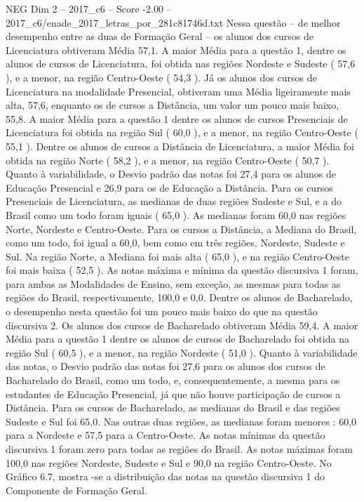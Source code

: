 \begin{textsample}{NEG Dim 2 – 2017\_c6 – Score -2.00 – 2017\_c6/enade\_2017\_letras\_por\_281c81746d.txt}
Nessa questão – de melhor desempenho entre as duas de Formação Geral – os alunos dos cursos de Licenciatura obtiveram Média 57,1.
A maior Média para a questão 1, dentre os alunos de cursos de Licenciatura, foi obtida nas regiões Nordeste e Sudeste ( 57,6 ), e a menor, na região Centro-Oeste ( 54,3 ).
Já os alunos dos cursos de Licenciatura na modalidade Presencial, obtiveram uma Média ligeiramente mais alta, 57,6, enquanto os de cursos a Distância, um valor um pouco mais baixo, 55,8.
A maior Média para a questão 1 dentre os alunos de cursos Presenciais de Licenciatura foi obtida na região Sul ( 60,0 ), e a menor, na região Centro-Oeste ( 55,1 ).
Dentre os alunos de cursos a Distância de Licenciatura, a maior Média foi obtida na região Norte ( 58,2 ), e a menor, na região Centro-Oeste ( 50,7 ).
Quanto à variabilidade, o Desvio padrão das notas foi 27,4 para os alunos de Educação Presencial e 26,9 para os de Educação a Distância.
Para os cursos Presenciais de Licenciatura, as medianas de duas regiões Sudeste e Sul, e a do Brasil como um todo foram iguais ( 65,0 ).
As medianas foram 60,0 nas regiões Norte, Nordeste e Centro-Oeste.
Para os cursos a Distância, a Mediana do Brasil, como um todo, foi igual a 60,0, bem como em três regiões, Nordeste, Sudeste e Sul.
Na região Norte, a Mediana foi mais alta ( 65,0 ), e na região Centro-Oeste foi mais baixa ( 52,5 ).
As notas máxima e mínima da questão discursiva 1 foram, para ambas as Modalidades de Ensino, sem exceção, as mesmas para todas as regiões do Brasil, respectivamente, 100,0 e 0,0.
Dentre os alunos de Bacharelado, o desempenho nesta questão foi um pouco mais baixo do que na questão discursiva 2.
Os alunos dos cursos de Bacharelado obtiveram Média 59,4.
A maior Média para a questão 1 dentre os alunos de cursos de Bacharelado foi obtida na região Sul ( 60,5 ), e a menor, na região Nordeste ( 51,0 ).
Quanto à variabilidade das notas, o Desvio padrão das notas foi 27,6 para os alunos dos cursos de Bacharelado do Brasil, como um todo, e, consequentemente, a mesma para os estudantes de Educação Presencial, já que não houve participação de cursos a Distância.
Para os cursos de Bacharelado, as medianas do Brasil e das regiões Sudeste e Sul foi 65,0.
Nas outras duas regiões, as medianas foram menores : 60,0 para a Nordeste e 57,5 para a Centro-Oeste.
As notas mínimas da questão discursiva 1 foram zero para todas as regiões do Brasil.
As notas máximas foram 100,0 nas regiões Nordeste, Sudeste e Sul e 90,0 na região Centro-Oeste.
No Gráfico 6.7, mostra -se a distribuição das notas na questão discursiva 1 do Componente de Formação Geral.

\end{textsample}
